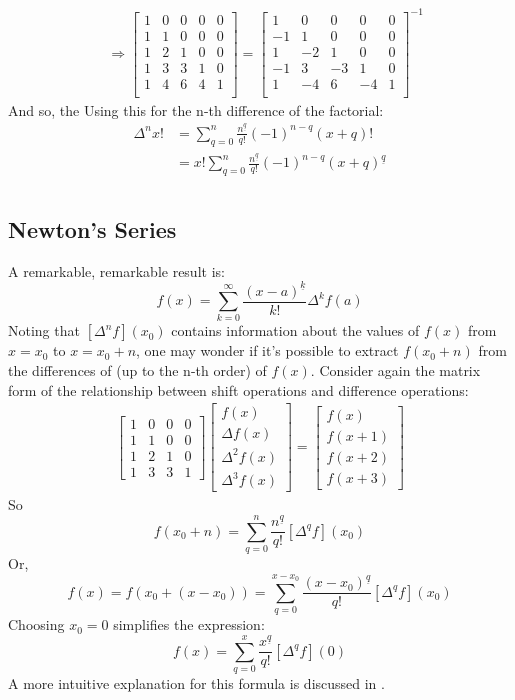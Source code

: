 \documentclass{article}
\renewcommand\({\left(}
\renewcommand\){\right)}
\begin{document}
\begin{align*}
    &\Rightarrow\begin{bmatrix}
 1 & 0 & 0 & 0 & 0 \\
 1 & 1 & 0 & 0 & 0 \\
 1 & 2 & 1 & 0 & 0 \\
 1 & 3 & 3 & 1 & 0 \\
 1 & 4 & 6 & 4 & 1 \\
    \end{bmatrix}=
    \begin{bmatrix}
 1 & 0 & 0 & 0 & 0 \\
 -1 & 1 & 0 & 0 & 0 \\
 1 & -2 & 1 & 0 & 0 \\
 -1 & 3 & -3 & 1 & 0 \\
 1 & -4 & 6 & -4 & 1 \\
    \end{bmatrix}^{-1}
\end{align*}
And so, the 
Using this for the n-th difference of the factorial:
\begin{align*}
    \Delta^nx!&=\sum_{q=0}^n\frac{n^{\underline{q}}}{q!}(-1)^{n-q}(x+q)!\\
    &=x!\sum_{q=0}^n\frac{n^{\underline{q}}}{q!}(-1)^{n-q}(x+q)^{\underline{q}}\\
\end{align*}

\subsection{Newton's Series}
A remarkable, remarkable result is:
\[f(x)=\sum_{k=0}^{\infty}\frac{(x-a)^{\underline{k}}}{k!}\Delta^kf(a)\]
Noting that $[\Delta^n f](x_0)$ contains information about the values of $f(x)$ from $x=x_0$ to $x=x_0+n$, one may wonder if it's possible to extract $f(x_0+n)$ from the differences of (up to the n-th order) of $f(x)$. Consider again the matrix form of the relationship between shift operations and difference operations:
\begin{align*}
    \begin{bmatrix}1&0&0&0\\1&1&0&0\\1&2&1&0\\1&3&3&1\end{bmatrix}\begin{bmatrix}f(x)\\\Delta f(x)\\\Delta^2 f(x)\\\Delta^3 f(x)\end{bmatrix}=\begin{bmatrix}f(x)\\f(x+1)\\f(x+2)\\f(x+3)\end{bmatrix}
\end{align*}
So
\[f(x_0+n)=\sum_{q=0}^n\frac{n^{\underline{q}}}{q!}[\Delta^qf](x_0)\]
Or, 
\[f(x)=f(x_0+(x-x_0))=\sum_{q=0}^{x-x_0}\frac{(x-x_0)^{\underline{q}}}{q!}[\Delta^qf](x_0)\]
Choosing $x_0=0$ simplifies the expression:
\[f(x)=\sum_{q=0}^{x}\frac{x^{\underline{q}}}{q!}[\Delta^qf](0)\]
A more intuitive explanation for this formula is discussed in \underline{ }.
\end{document}
